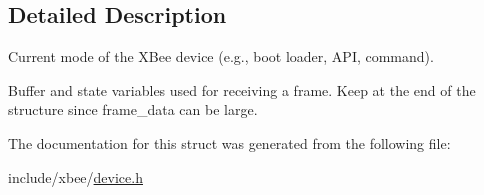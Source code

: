 \subsection{Detailed Description}
Current mode of the X\+Bee device (e.\+g., boot loader, A\+PI, command). 

Buffer and state variables used for receiving a frame. Keep at the end of the structure since frame\+\_\+data can be large. 

The documentation for this struct was generated from the following file\+:\begin{DoxyCompactItemize}
\item 
include/xbee/\hyperlink{device_8h}{device.\+h}\end{DoxyCompactItemize}
